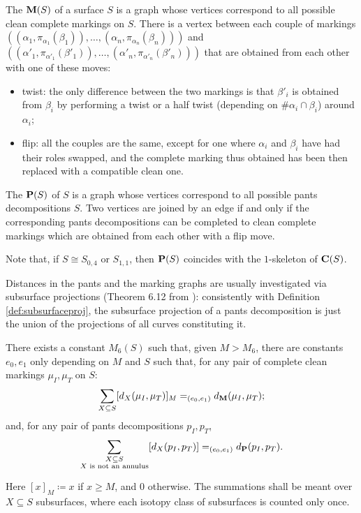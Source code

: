 \begin{defin}
The  $\mathbf M(S)$ of a surface $S$ is a graph whose vertices correspond to all possible clean complete markings on $S$. There is a vertex between each couple of markings $\left((\alpha_1,\pi_{\alpha_1}(\beta_1)),\ldots,(\alpha_n,\pi_{\alpha_n}(\beta_n))\right)$ and\linebreak $\left((\alpha'_1,\pi_{\alpha'_1}(\beta'_1)),\ldots,(\alpha'_n,\pi_{\alpha'_n}(\beta'_n))\right)$ that are obtained from each other with one of these moves:
\begin{itemize}
\item twist: the only difference between the two markings is that $\beta'_i$ is obtained from $\beta_i$ by performing a twist or a half twist (depending on $\#\alpha_i\cap\beta_i$) around $\alpha_i$;
\item flip: all the couples are the same, except for one where $\alpha_i$ and $\beta_i$ have had their roles swapped, and the complete marking thus obtained has been then replaced with a compatible clean one.
\end{itemize}

The  $\mathbf P(S)$ of $S$ is a graph whose vertices correspond to all possible pants decompositions $S$. Two vertices are joined by an edge if and only if the corresponding pants decompositions can be completed to clean complete markings which are obtained from each other with a flip move.
\end{defin}

Note that, if $S\cong S_{0,4}$ or $S_{1,1}$, then $\mathbf P(S)$ coincides with the $1$-skeleton of $\mathbf C(S)$.

Distances in the pants and the marking graphs are usually investigated via subsurface projections (Theorem 6.12 from \cite{masurminskyii}): consistently with Definition \ref{def:subsurfaceproj}, the subsurface projection of a pants decomposition is just the union of the projections of all curves constituting it.

\begin{theo}\label{thm:mmprojectiondist}
There exists a constant $M_6(S)$ such that, given $M>M_6$, there are constants $e_0, e_1$ only depending on $M$ and $S$ such that, for any pair of complete clean markings $\mu_I, \mu_T$ on $S$:
$$
\sum_{X\subseteq S} [d_X(\mu_I, \mu_T)]_M =_{(e_0,e_1)} d_{\mathbf M}(\mu_I, \mu_T);
$$
and, for any pair of pants decompositions $p_I, p_T$,
$$
\sum_{\substack{X\subseteq S\\ X\text{ is not an annulus}}} [d_X(p_I, p_T)] =_{(e_0,e_1)} d_{\mathbf P}(p_I, p_T).
$$

Here $[x]_M\coloneqq x$ if $x\geq M$, and $0$ otherwise. The summations shall be meant over $X\subseteq S$ subsurfaces, where each isotopy class of subsurfaces is counted only once.
\end{theo}

